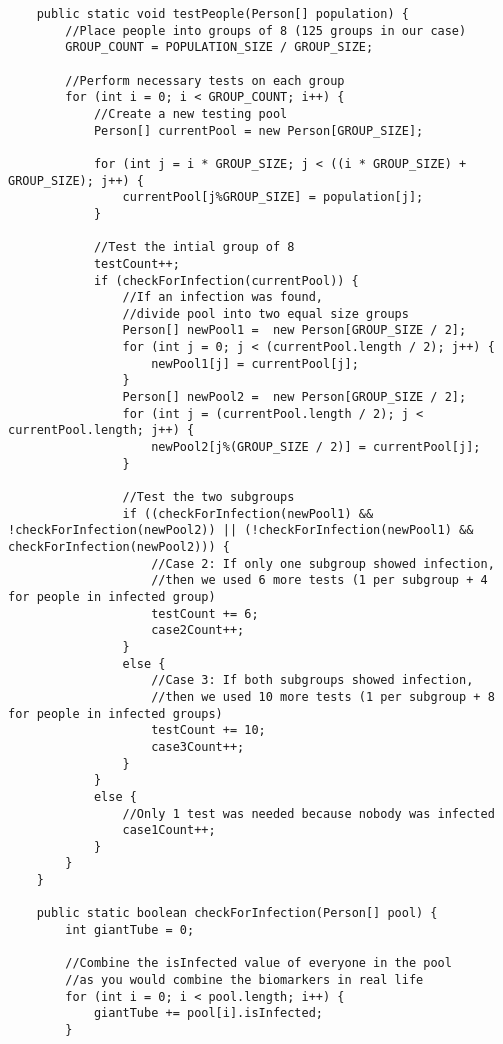\documentclass[letterpaper, 10pt,DIV=13]{scrartcl}
\numberwithin{equation}{section} %
\numberwithin{figure}{section} %
\numberwithin{table}{section} %
\begin{document}
\begin{lstlisting}
    public static void testPeople(Person[] population) {
        //Place people into groups of 8 (125 groups in our case)
        GROUP_COUNT = POPULATION_SIZE / GROUP_SIZE;

        //Perform necessary tests on each group
        for (int i = 0; i < GROUP_COUNT; i++) {
            //Create a new testing pool
            Person[] currentPool = new Person[GROUP_SIZE];
            
            for (int j = i * GROUP_SIZE; j < ((i * GROUP_SIZE) + GROUP_SIZE); j++) {
                currentPool[j%GROUP_SIZE] = population[j];
            }

            //Test the intial group of 8 
            testCount++;
            if (checkForInfection(currentPool)) {
                //If an infection was found, 
                //divide pool into two equal size groups
                Person[] newPool1 =  new Person[GROUP_SIZE / 2];
                for (int j = 0; j < (currentPool.length / 2); j++) {
                    newPool1[j] = currentPool[j];
                }
                Person[] newPool2 =  new Person[GROUP_SIZE / 2];
                for (int j = (currentPool.length / 2); j < currentPool.length; j++) {
                    newPool2[j%(GROUP_SIZE / 2)] = currentPool[j];
                }
                
                //Test the two subgroups
                if ((checkForInfection(newPool1) && !checkForInfection(newPool2)) || (!checkForInfection(newPool1) && checkForInfection(newPool2))) {
                    //Case 2: If only one subgroup showed infection, 
                    //then we used 6 more tests (1 per subgroup + 4 for people in infected group)
                    testCount += 6;
                    case2Count++;
                }
                else {
                    //Case 3: If both subgroups showed infection, 
                    //then we used 10 more tests (1 per subgroup + 8 for people in infected groups)
                    testCount += 10;
                    case3Count++;
                }
            }
            else {
                //Only 1 test was needed because nobody was infected
                case1Count++;
            }
        }
    }

    public static boolean checkForInfection(Person[] pool) {
        int giantTube = 0;
        
        //Combine the isInfected value of everyone in the pool
        //as you would combine the biomarkers in real life
        for (int i = 0; i < pool.length; i++) {
            giantTube += pool[i].isInfected;
        }


\end{lstlisting}
\end{document}
